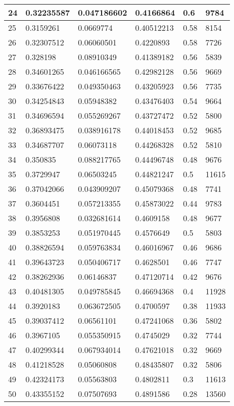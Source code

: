 \begin{longtable}{|l|l|l|l|l|l|}
24 & 0.32235587 & 0.047186602 & 0.4166864 & 0.6 & 9784 \\ \hline 
25 & 0.3159261 & 0.0669774 & 0.40512213 & 0.58 & 8154 \\ \hline 
26 & 0.32307512 & 0.06060501 & 0.4220893 & 0.58 & 7726 \\ \hline 
27 & 0.328198 & 0.08910349 & 0.41389182 & 0.56 & 5839 \\ \hline 
28 & 0.34601265 & 0.046166565 & 0.42982128 & 0.56 & 9669 \\ \hline 
29 & 0.33676422 & 0.049350463 & 0.43205923 & 0.56 & 7735 \\ \hline 
30 & 0.34254843 & 0.05948382 & 0.43476403 & 0.54 & 9664 \\ \hline 
31 & 0.34696594 & 0.055269267 & 0.43727472 & 0.52 & 5800 \\ \hline 
32 & 0.36893475 & 0.038916178 & 0.44018453 & 0.52 & 9685 \\ \hline 
33 & 0.34687707 & 0.06073118 & 0.44268328 & 0.52 & 5810 \\ \hline 
34 & 0.350835 & 0.088217765 & 0.44496748 & 0.48 & 9676 \\ \hline 
35 & 0.3729947 & 0.06503245 & 0.44821247 & 0.5 & 11615 \\ \hline 
36 & 0.37042066 & 0.043909207 & 0.45079368 & 0.48 & 7741 \\ \hline 
37 & 0.3604451 & 0.057213355 & 0.45873022 & 0.44 & 9783 \\ \hline 
38 & 0.3956808 & 0.032681614 & 0.4609158 & 0.48 & 9677 \\ \hline 
39 & 0.3853253 & 0.051970445 & 0.4576649 & 0.5 & 5803 \\ \hline 
40 & 0.38826594 & 0.059763834 & 0.46016967 & 0.46 & 9686 \\ \hline 
41 & 0.39643723 & 0.050406717 & 0.4628501 & 0.46 & 7747 \\ \hline 
42 & 0.38262936 & 0.06146837 & 0.47120714 & 0.42 & 9676 \\ \hline 
43 & 0.40481305 & 0.049785845 & 0.46694368 & 0.4 & 11928 \\ \hline 
44 & 0.3920183 & 0.063672505 & 0.4700597 & 0.38 & 11933 \\ \hline 
45 & 0.39037412 & 0.06561101 & 0.47241068 & 0.36 & 5802 \\ \hline 
46 & 0.3967105 & 0.055350915 & 0.4745029 & 0.32 & 7744 \\ \hline 
47 & 0.40299344 & 0.067934014 & 0.47621018 & 0.32 & 9669 \\ \hline 
48 & 0.41218528 & 0.05060808 & 0.48435807 & 0.32 & 5806 \\ \hline 
49 & 0.42324173 & 0.05563803 & 0.4802811 & 0.3 & 11613 \\ \hline 
50 & 0.43355152 & 0.07507693 & 0.4891586 & 0.28 & 13560 \\ \hline 
\end{longtable}